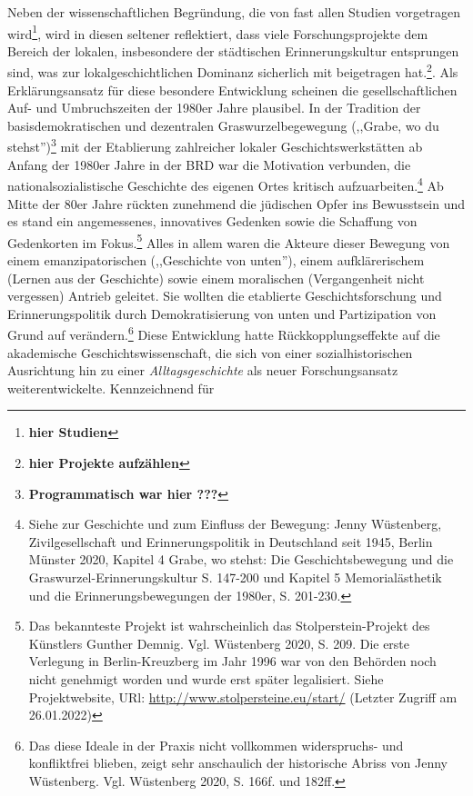 Neben der wissenschaftlichen Begründung, die von fast allen Studien vorgetragen wird\footnote{\textbf{hier Studien}}, wird in diesen seltener reflektiert, dass viele Forschungsprojekte dem Bereich der lokalen, insbesondere der städtischen Erinnerungskultur entsprungen sind, was zur lokalgeschichtlichen Dominanz sicherlich mit beigetragen hat.\footnote{\textbf{hier Projekte aufzählen}}. Als Erklärungsansatz für diese besondere Entwicklung scheinen die gesellschaftlichen Auf- und Umbruchszeiten der 1980er Jahre plausibel. In der Tradition der basisdemokratischen und dezentralen Graswurzelbegewegung (,,Grabe, wo du stehst'')\footnote{\textbf{Programmatisch war hier ???}} mit der Etablierung zahlreicher lokaler Geschichtswerkstätten ab Anfang der 1980er Jahre in der BRD war die Motivation verbunden, die nationalsozialistische Geschichte des eigenen Ortes kritisch aufzuarbeiten.\footnote{Siehe zur Geschichte und zum Einfluss der Bewegung: Jenny Wüstenberg, Zivilgesellschaft und Erinnerungspolitik in Deutschland seit 1945, Berlin Münster 2020, Kapitel 4 Grabe, wo stehst: Die Geschichtsbewegung und die Graswurzel-Erinnerungskultur S. 147-200 und Kapitel 5 Memorialästhetik und die Erinnerungsbewegungen der 1980er, S. 201-230.} Ab Mitte der 80er Jahre rückten zunehmend die jüdischen Opfer ins Bewusstsein und es stand ein angemessenes, innovatives Gedenken sowie die Schaffung von Gedenkorten im Fokus.\footnote{Das bekannteste Projekt ist wahrscheinlich das Stolperstein-Projekt des Künstlers Gunther Demnig. Vgl. Wüstenberg 2020, S. 209. Die erste Verlegung in Berlin-Kreuzberg im Jahr 1996 war von den Behörden noch nicht genehmigt worden und wurde erst später legalisiert. Siehe Projektwebsite, URl: \url{http://www.stolpersteine.eu/start/} (Letzter Zugriff am 26.01.2022)} Alles in allem waren die Akteure dieser Bewegung von einem emanzipatorischen (,,Geschichte von unten''), einem aufklärerischem (Lernen aus der Geschichte) sowie einem moralischen (Vergangenheit nicht vergessen) Antrieb geleitet. Sie wollten die etablierte Geschichtsforschung und Erinnerungspolitik durch Demokratisierung von unten und Partizipation von Grund auf verändern.\footnote{Das diese Ideale in der Praxis nicht vollkommen widerspruchs- und konfliktfrei blieben, zeigt sehr anschaulich der historische Abriss von Jenny Wüstenberg. Vgl. Wüstenberg 2020, S. 166f. und 182ff.} Diese Entwicklung hatte Rückkopplungseffekte auf die akademische Geschichtswissenschaft, die sich von einer sozialhistorischen Ausrichtung hin zu einer \textit{Alltagsgeschichte} als neuer Forschungsansatz weiterentwickelte. Kennzeichnend für 

